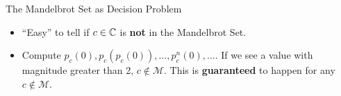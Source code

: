 \documentclass[c]{beamer}
\begin{document}
\begin{frame}{The Mandelbrot Set as Decision Problem}
  
  \begin{itemize}
  \item[] ``Easy'' to tell if $c \in \mathbb{C}$ is \textbf{not} in
    the Mandelbrot Set.\pause

    \vspace{\baselineskip}

  \item[] Compute $p_c(0), p_c(p_c(0)), \ldots, p_c^n(0), \ldots$. If
    we see a value with magnitude greater than 2, $c \notin
    \mathcal{M}$.  This is \textbf{guaranteed} to happen for any $c
    \notin \mathcal{M}$.

    \vspace{\baselineskip}

  \end{itemize}
\end{frame}
\end{document}
